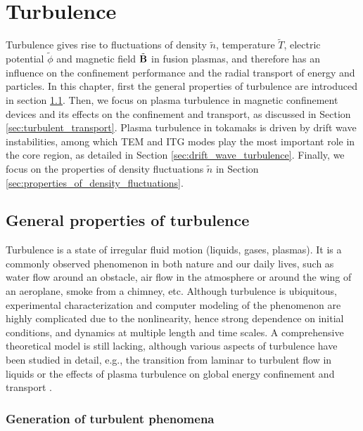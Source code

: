 
\chapter{Turbulence} \label{ch:Turbulence}
\graphicspath{{chapter2_ys/}}
\minitoc


Turbulence gives rise to fluctuations of density $\tilde{n}$, temperature $\tilde{T}$, electric potential $\tilde{\phi}$ and magnetic field $\tilde{\boldsymbol{\mathrm{B}}}$ in fusion plasmas, and therefore has an influence on the confinement performance and the radial transport of energy and particles. In this chapter, first the general properties of turbulence are introduced in section \ref{sec:general_turbulence}. Then, we focus on plasma turbulence in magnetic confinement devices and its effects on the confinement and transport, as discussed in Section \ref{sec:turbulent_transport}. Plasma turbulence in tokamaks is driven by drift wave instabilities, among which TEM and ITG modes play the most important role in the core region, as detailed in Section \ref{sec:drift_wave_turbulence}. Finally, we focus on the properties of density fluctuations $\tilde{n}$ in Section \ref{sec:properties_of_density_fluctuations}.


\section{General properties of turbulence} \label{sec:general_turbulence}

Turbulence is a state of irregular fluid motion (liquids, gases, plasmas). It is a commonly observed phenomenon in both nature and our daily lives, such as water flow around an obstacle, air flow in the atmosphere or around the wing of an aeroplane, smoke from a chimney, etc. Although turbulence is ubiquitous, experimental characterization and computer modeling of the phenomenon are highly complicated due to the nonlinearity, hence strong dependence on initial conditions, and dynamics at multiple length and time scales. A comprehensive theoretical model is still lacking, although various aspects of turbulence have been studied in detail, e.g., the transition from laminar to turbulent flow in liquids \cite{Chu_1993_JFM} or the effects of plasma turbulence on global energy confinement and transport \cite{TFR_1986_NF, Garbet_1992_NF}.


\subsection{Generation of turbulent phenomena} \label{sec:phenomena_of_turbulence}

